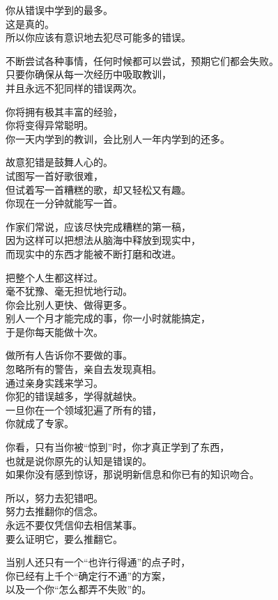 \documentclass[
]{article}
\begin{document}
你从错误中学到的最多。\\
这是真的。\\
所以你应该有意识地去犯尽可能多的错误。

不断尝试各种事情，任何时候都可以尝试，预期它们都会失败。\\
只要你确保从每一次经历中吸取教训，\\
并且永远不犯同样的错误两次。

你将拥有极其丰富的经验，\\
你将变得异常聪明。\\
你一天内学到的教训，会比别人一年内学到的还多。

故意犯错是鼓舞人心的。\\
试图写一首好歌很难，\\
但试着写一首糟糕的歌，却又轻松又有趣。\\
你现在一分钟就能写一首。

作家们常说，应该尽快完成糟糕的第一稿，\\
因为这样可以把想法从脑海中释放到现实中，\\
而现实中的东西才能被不断打磨和改进。

把整个人生都这样过。\\
毫不犹豫、毫无担忧地行动。\\
你会比别人更快、做得更多。\\
别人一个月才能完成的事，你一小时就能搞定，\\
于是你每天能做十次。

做所有人告诉你不要做的事。\\
忽略所有的警告，亲自去发现真相。\\
通过亲身实践来学习。\\
你犯的错误越多，学得就越快。\\
一旦你在一个领域犯遍了所有的错，\\
你就成了专家。

你看，只有当你被``惊到''时，你才真正学到了东西，\\
也就是说你原先的认知是错误的。\\
如果你没有感到惊讶，那说明新信息和你已有的知识吻合。

所以，努力去犯错吧。\\
努力去推翻你的信念。\\
永远不要仅凭信仰去相信某事。\\
要么证明它，要么推翻它。

当别人还只有一个``也许行得通''的点子时，\\
你已经有上千个``确定行不通''的方案，\\
以及一个你``怎么都弄不失败''的。
\end{document}
